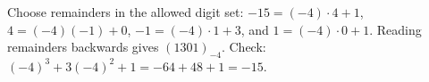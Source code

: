 Choose remainders in the allowed digit set: $-15=(-4)\cdot4+1$, $4=(-4)(-1)+0$, $-1=(-4)\cdot1+3$, and $1=(-4)\cdot0+1$. Reading remainders backwards gives $\boxed{(1301)_{-4}}$. Check: $(-4)^3+3(-4)^2+1=-64+48+1=-15$.
